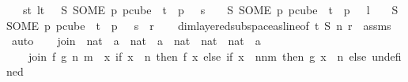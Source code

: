 \begin{isabellebody}
\ \ \ {\isachardoublequoteopen}{\isasymforall}s{\isacharless}{\kern0pt}t{\isachardot}{\kern0pt}\ {\isasymforall}l{\isacharless}{\kern0pt}t{\isachardot}{\kern0pt}\ \ {\isasymchi}\ {\isacharparenleft}{\kern0pt}S\ {\isacharparenleft}{\kern0pt}SOME\ p{\isachardot}{\kern0pt}\ p{\isasymin}cube\ {}\ {\isacharparenleft}{\kern0pt}t{\isacharplus}{\kern0pt}{}{\isacharparenright}{\kern0pt}\ {\isasymand}\ p\ {}\ {\isacharequal}{\kern0pt}\ s{\isacharparenright}{\kern0pt}{\isacharparenright}{\kern0pt}\ {\isacharequal}{\kern0pt}\ \ {\isasymchi}\ {\isacharparenleft}{\kern0pt}S\ {\isacharparenleft}{\kern0pt}SOME\ p{\isachardot}{\kern0pt}\ p{\isasymin}cube\ {}\ {\isacharparenleft}{\kern0pt}t{\isacharplus}{\kern0pt}{}{\isacharparenright}{\kern0pt}\ {\isasymand}\ p\ {}\ {\isacharequal}{\kern0pt}\ l{\isacharparenright}{\kern0pt}{\isacharparenright}{\kern0pt}\ {\isasymand}\ \ {\isasymchi}\ {\isacharparenleft}{\kern0pt}S\ {\isacharparenleft}{\kern0pt}SOME\ p{\isachardot}{\kern0pt}\ p{\isasymin}cube\ {}\ {\isacharparenleft}{\kern0pt}t{\isacharplus}{\kern0pt}{}{\isacharparenright}{\kern0pt}\ {\isasymand}\ p\ {}\ {\isacharequal}{\kern0pt}\ s{\isacharparenright}{\kern0pt}{\isacharparenright}{\kern0pt}\ {\isacharless}{\kern0pt}\ r{\isachardoublequoteclose}\isanewline
%
\isadelimproof
\ \ %
\endisadelimproof
%
\isatagproof
{}\isamarkupfalse%
\ dim{}{\isacharunderscore}{\kern0pt}layered{\isacharunderscore}{\kern0pt}subspace{\isacharunderscore}{\kern0pt}as{\isacharunderscore}{\kern0pt}line{\isacharbrackleft}{\kern0pt}of\ t\ S\ n\ r\ {\isasymchi}{\isacharbrackright}{\kern0pt}\ assms\ \isamarkupfalse%
\ auto%
\endisatagproof
{\isafoldproof}%
%
\isadelimproof
\ \ \isanewline
%
\endisadelimproof
\isanewline
{}\isamarkupfalse%
\ join\ {\isacharcolon}{\kern0pt}{\isacharcolon}{\kern0pt}\ {\isachardoublequoteopen}{\isacharparenleft}{\kern0pt}nat\ {\isasymRightarrow}\ {\isacharprime}{\kern0pt}a{\isacharparenright}{\kern0pt}\ {\isasymRightarrow}\ {\isacharparenleft}{\kern0pt}nat\ {\isasymRightarrow}\ {\isacharprime}{\kern0pt}a{\isacharparenright}{\kern0pt}\ {\isasymRightarrow}\ nat\ {\isasymRightarrow}\ nat\ {\isasymRightarrow}\ {\isacharparenleft}{\kern0pt}nat\ {\isasymRightarrow}\ {\isacharprime}{\kern0pt}a{\isacharparenright}{\kern0pt}{\isachardoublequoteclose}\isanewline
\ \ \isanewline
\ \ \ \ {\isachardoublequoteopen}join\ f\ g\ n\ m\ {\isasymequiv}\ {\isacharparenleft}{\kern0pt}{\isasymlambda}x{\isachardot}{\kern0pt}\ if\ x\ {\isasymin}\ {\isacharbraceleft}{\kern0pt}{\isachardot}{\kern0pt}{\isachardot}{\kern0pt}{\isacharless}{\kern0pt}n{\isacharbraceright}{\kern0pt}\ then\ f\ x\ else\ {\isacharparenleft}{\kern0pt}if\ x\ {\isasymin}\ {\isacharbraceleft}{\kern0pt}n{\isachardot}{\kern0pt}{\isachardot}{\kern0pt}{\isacharless}{\kern0pt}n{\isacharplus}{\kern0pt}m{\isacharbraceright}{\kern0pt}\ then\ g\ {\isacharparenleft}{\kern0pt}x\ {\isacharminus}{\kern0pt}\ n{\isacharparenright}{\kern0pt}\ else\ undefined{\isacharparenright}{\kern0pt}{\isacharparenright}{\kern0pt}{\isachardoublequoteclose}\isanewline

\end{isabellebody}

